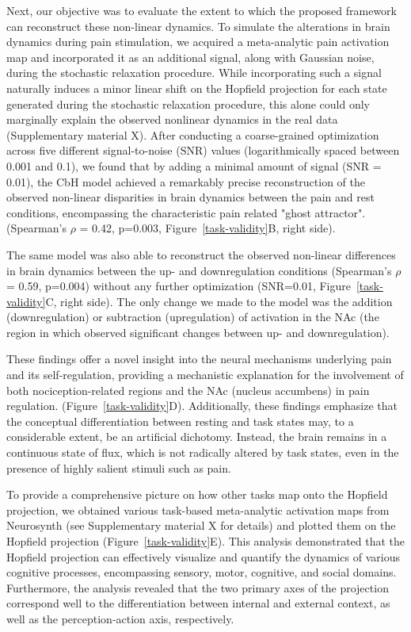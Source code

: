 \documentclass{article}
\begin{document}
Next, our objective was to evaluate the extent to which the proposed framework can reconstruct these non-linear
dynamics. To simulate the alterations in brain dynamics during pain stimulation, we acquired a meta-analytic pain
activation map \citep{zunhammer2021meta} and incorporated it as an additional signal, along with Gaussian noise,
during the stochastic relaxation procedure. While incorporating such a signal naturally induces a minor linear shift
on the Hopfield projection for each state generated during the stochastic relaxation procedure, this alone could only
marginally explain the observed nonlinear dynamics in the real data (Supplementary material X). After conducting a
coarse-grained optimization across five different signal-to-noise (SNR) values (logarithmically spaced between
0.001 and 0.1), we found that by adding a minimal amount of signal (SNR = 0.01), the CbH model achieved a remarkably
precise reconstruction of the observed non-linear disparities in brain dynamics between the pain and rest conditions,
encompassing the characteristic pain related "ghost attractor". (Spearman's $\rho$ = 0.42, p=0.003,
Figure~\ref{task-validity}B, right side).

The same model was also able to reconstruct the observed non-linear differences in brain dynamics between the up- and
downregulation conditions (Spearman's $\rho$ = 0.59, p=0.004) without any further optimization (SNR=0.01,
Figure~\ref{task-validity}C, right side). The only change we made to the model was the addition (downregulation) or
subtraction (upregulation) of activation in the NAc (the region in which \citep{woo2015distinct} observed significant
changes between up- and downregulation).

These findings offer a novel insight into the neural mechanisms underlying pain and its self-regulation, providing a
mechanistic explanation for the involvement of both nociception-related regions and the NAc (nucleus accumbens) in pain
regulation. (Figure~\ref{task-validity}D). Additionally, these findings emphasize that the conceptual differentiation
between resting and task states may, to a considerable extent, be an artificial dichotomy. Instead, the brain remains
in a continuous state of flux, which is not radically altered by task states, even in the presence of highly salient
stimuli such as pain.


To provide a comprehensive picture on how other tasks map onto the Hopfield projection, we obtained various task-based
meta-analytic activation maps from Neurosynth (see Supplementary material X for details) and plotted them on the
Hopfield projection (Figure~\ref{task-validity}E). This analysis demonstrated that the Hopfield projection can effectively
visualize and quantify the dynamics of various cognitive processes, encompassing sensory, motor, cognitive, and social
domains. Furthermore, the analysis revealed that the two primary axes of the projection correspond well to the
differentiation between internal and external context, as well as the perception-action axis, respectively.
\end{document}
